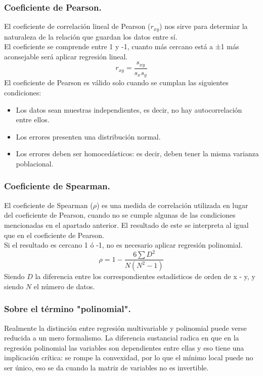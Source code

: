 \documentclass[a4paper,11pt]{article}
\begin{document}
\subsubsection{Coeficiente de Pearson.}

El coeficiente de correlación lineal de Pearson ($r_{xy}$) nos sirve para determiar la naturaleza de la relación que guardan los datos entre sí. \\

\noindent
El coeficiente se comprende entre 1 y -1, cuanto más cercano está a ±1 más aconsejable será aplicar regresión lineal.
\[
r_{xy}=\frac{s_{xy}}{s_x s_y}
\]
El coeficiente de Pearson es válido solo cuando se cumplan las siguientes condiciones:
\begin{itemize}
    \item Los datos sean muestras independientes, es decir, no hay autocorrelación entre ellos.
    \item Los errores presenten una distribución normal.
    \item Los errores deben ser homocedásticos: es decir, deben tener la misma
varianza poblacional.
\end{itemize}
\subsubsection{Coeficiente de Spearman.}

El coeficiente de Spearman ($\rho$) es una medida de correlación utilizada en lugar del coeficiente de Pearson, cuando no se cumple algunas de las condiciones mencionadas en el apartado anterior. El resultado de este se interpreta al igual que en el coeficiente de Pearson. \\

\noindent
Si el resultado es cercano 1 ó -1, no es necesario aplicar regresión polinomial.
\[
\rho = 1 - \frac{6\sum D^2}{N(N^2 - 1)}
\]
Siendo $D$  la diferencia entre los correspondientes estadísticos de orden de x - y, y siendo $N$ el número de datos.

\subsubsection{Sobre el término "polinomial".}

\indent
Realmente la distinción entre regresión multivariable y polinomial puede verse reducida a un mero formalismo. La diferencia sustancial radica en que en la regresión polinomial las variables son dependientes entre ellas y eso tiene una implicación crítica: se rompe la convexidad, por lo que el mínimo local puede no ser único, eso se da cuando la matriz de variables no es invertible.
\end{document}
